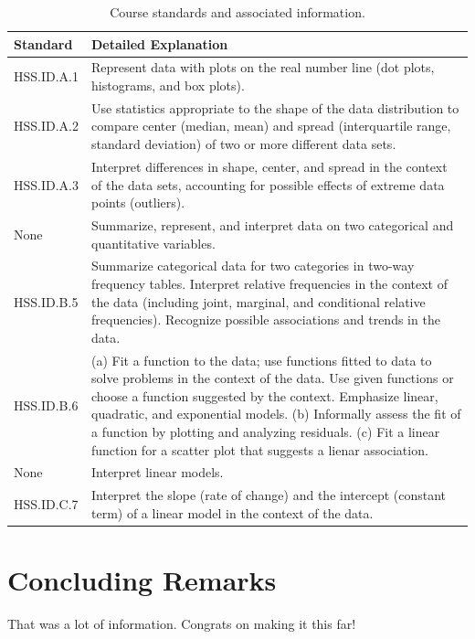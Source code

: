 \documentclass[12pt, oneside]{book}
\begin{document}
\begin{table}[h]
    \centering
    \caption{Course standards and associated information.}
    \vspace{0.3cm} %
    \begin{tabularx}{\textwidth}{l X} %
        \toprule
        \textbf{Standard} & \textbf{Detailed Explanation} \\
        \midrule
        HSS.ID.A.1 & Represent data with plots on the real number line (dot plots, histograms, and box plots). \\
        HSS.ID.A.2 & Use statistics appropriate to the shape of the data distribution to compare center (median, mean) and spread (interquartile range, standard deviation) of two or more different data sets. \\
        HSS.ID.A.3 & Interpret differences in shape, center, and spread in the context of the data sets, accounting for possible effects of extreme data points (outliers). \\
        None & Summarize, represent, and interpret data on two categorical and quantitative variables. \\
        HSS.ID.B.5 & Summarize categorical data for two categories in two-way frequency tables. Interpret relative frequencies in the context of the data (including joint, marginal, and conditional relative frequencies). Recognize possible associations and trends in the data. \\
        HSS.ID.B.6 & (a) Fit a function to the data; use functions fitted to data to solve problems in the context of the data. Use given functions or choose a function suggested by the context. Emphasize linear, quadratic, and exponential models. (b) Informally assess the fit of a function by plotting and analyzing residuals. (c) Fit a linear function for a scatter plot that suggests a lienar association. \\
        None & Interpret linear models. \\
        HSS.ID.C.7 & Interpret the slope (rate of change) and the intercept (constant term) of a linear model in the context of the data. \\
        \bottomrule
    \end{tabularx}
\end{table}

\chapter{Concluding Remarks}

That was a lot of information. Congrats on making it this far!
\end{document}
